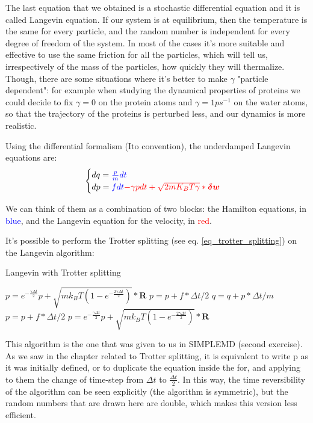 The last equation that we obtained is a stochastic differential equation and it is called Langevin equation. If our system is at equilibrium, then the temperature is the same for every particle, and the random number is independent for every degree of freedom of the system. 
In most of the cases it's more suitable and effective to use the same friction for all the particles, which will tell us, irrespectively of the mass of the particles, how quickly they will thermalize. Though, there are some situations where it's better to make $\gamma$ "particle dependent": for example when studying the dynamical properties of proteins we could decide to fix $\gamma =0$ on the protein atoms and $\gamma = 1 ps^{-1}$ on the water atoms, so that the trajectory of the proteins is perturbed less, and our dynamics is more realistic. 

Using the differential formalism (Ito convention), the underdamped Langevin equations are:
\begin{equation}
    \begin{cases}
    dq = \color{blue}{\frac{p}{m}dt}\\
    dp = \color{blue}{f dt} \color{red}{-\gamma p dt + \sqrt{2mK_BT\gamma}* \boldsymbol{\delta w}}
    \end{cases}
\end{equation}

We can think of them as a combination of two blocks: the Hamilton equations, in \textcolor{blue}{blue}, and the Langevin equation for the velocity, in \textcolor{red}{red}.

It's possible to perform the Trotter splitting (see eq. \ref{eq_trotter_splitting}) on the Langevin algorithm:

\begin{algorithm}[H]\label{Langevin_trotter}
			\caption{Langevin with Trotter splitting}
			\begin{algorithmic}[1]
				\State $p=e^{-\frac{\gamma \Delta t}{2}}p + \sqrt{mk_BT \left(1-e^{-\frac{2\gamma \Delta t}{2}}\right)}*\boldsymbol{R}$
				\State $p=p+f*\Delta t/2$
				\State $q=q+p*\Delta t/m$
				\State $p=p+f*\Delta t/2$
				\State $p=e^{-\frac{\gamma \Delta t}{2}}p + \sqrt{mk_BT \left(1-e^{-\frac{2\gamma \Delta t}{2}}\right)}*\boldsymbol{R}$
				\EndFor
			\end{algorithmic}
		\end{algorithm}
		
This algorithm is the one that was given to us in SIMPLEMD (second exercise). As we saw in the chapter related to Trotter splitting, it is equivalent to write p as it was initially defined, or to duplicate the equation inside the for, and applying to them the change of time-step from $\Delta t$ to $\frac{\Delta t}{2}$. In this way, the time reversibility of the algorithm can be seen explicitly (the algorithm is symmetric), but the random numbers that are drawn here are double, which makes this version less efficient.
\\
